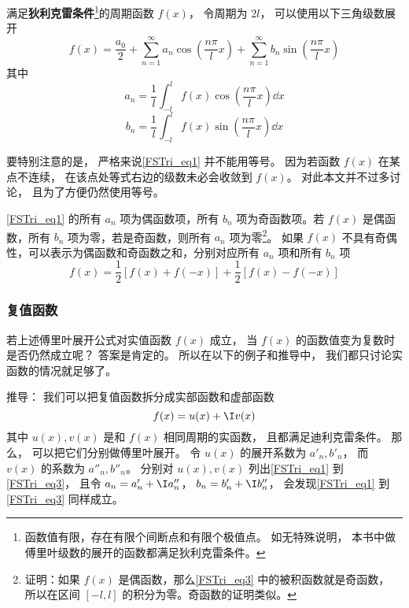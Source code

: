 


满足\textbf{狄利克雷条件}\footnote{函数值有限，存在有限个间断点和有限个极值点。 如无特殊说明， 本书中做傅里叶级数的展开的函数都满足狄利克雷条件。}的周期函数 $f(x)$， 令周期为 $2l$， 可以使用以下三角级数展开
\begin{equation}\label{FSTri_eq1}
f( x ) = \frac{a_0}{2} + \sum_{n = 1}^\infty a_n \cos (\frac{n\pi}{l}x) + \sum_{n = 1}^\infty b_n \sin (\frac{n\pi}{l}x)
\end{equation}
其中
\begin{equation}\label{FSTri_eq2}
a_n = \frac{1}{l} \int_{ - l}^l f( x )\cos(\frac{n\pi}{l}x) \dd{x} 
\end{equation}
\begin{equation}\label{FSTri_eq3}
b_n = \frac{1}{l} \int_{ - l}^l f( x )\sin(\frac{n\pi}{l}x) \dd{x}
\end{equation}

要特别注意的是， 严格来说\autoref{FSTri_eq1} 并不能用等号。 因为若函数 $f(x)$ 在某点不连续， 在该点处等式右边的级数未必会收敛到 $f(x)$。 对此本文并不过多讨论， 且为了方便仍然使用等号。

\autoref{FSTri_eq1} 的所有 $a_n$ 项为偶函数项，所有 $b_n$ 项为奇函数项。若 $f(x)$ 是偶函数，所有 $b_n$ 项为零，若是奇函数，则所有 $a_n$ 项为零\footnote{证明：如果 $f(x)$ 是偶函数，那么\autoref{FSTri_eq3} 中的被积函数就是奇函数， 所以在区间 $[-l,l]$ 的积分为零。奇函数的证明类似。}。 如果 $f(x)$ 不具有奇偶性，可以表示为偶函数和奇函数之和，分别对应所有 $a_n$ 项和所有 $b_n$ 项
\begin{equation}
f(x) = \frac12 [f(x)+f(-x)] + \frac12 [f(x)-f(-x)]
\end{equation}

\subsubsection{复值函数}
若上述傅里叶展开公式对实值函数 $f(x)$ 成立， 当 $f(x)$ 的函数值变为复数时是否仍然成立呢？ 答案是肯定的。 所以在以下的例子和推导中， 我们都只讨论实函数的情况就足够了。

推导： 我们可以把复值函数拆分成实部函数和虚部函数
\begin{equation}
f(x) = u(x) + \I v(x)
\end{equation}
其中 $u(x), v(x)$ 是和 $f(x)$ 相同周期的实函数， 且都满足迪利克雷条件。 那么， 可以把它们分别做傅里叶展开。 令 $u(x)$ 的展开系数为 $a'_n, b'_n$， 而 $v(x)$ 的系数为 $a''_n, b''_n$。 分别对 $u(x), v(x)$ 列出\autoref{FSTri_eq1} 到\autoref{FSTri_eq3}， 且令 $a_n = a'_n + \I a''_n$， $b_n = b'_n + \I b''_n$， 会发现\autoref{FSTri_eq1} 到\autoref{FSTri_eq3} 同样成立。

